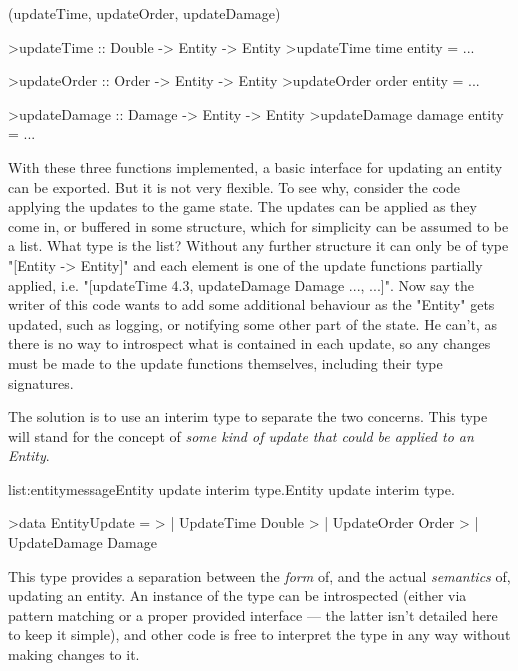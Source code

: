 \functions(updateTime, updateOrder, updateDamage)
\begin{haskell}

>updateTime :: Double -> Entity -> Entity
>updateTime time entity = ...

>updateOrder :: Order -> Entity -> Entity
>updateOrder order entity = ... 

>updateDamage :: Damage -> Entity -> Entity
>updateDamage damage entity = ...

\end{haskell}
\noindent With these three functions implemented, a basic interface for updating an entity can be exported. But it is not very flexible. To see why, consider the code applying the updates to the game state. The updates can be applied as they come in, or buffered in some structure, which for simplicity can be assumed to be a list. What type is the list? Without any further structure it can only be of type "[Entity -> Entity]" and each element is one of the update functions partially applied, i.e. "[updateTime 4.3, updateDamage Damage {...}, ...]". Now say the writer of this code wants to add some additional behaviour as the "Entity" gets updated, such as logging, or notifying some other part of the state. He can't, as there is no way to introspect what is contained in each update, so any changes must be made to the update functions themselves, including their type signatures.

The solution is to use an interim type to separate the two concerns. This type will stand for the concept of \emph{some kind of update that could be applied to an Entity}.

\vspace{-0.5em}
\begin{listing}{list:entitymessage}{Entity update interim type.}{Entity update interim type.}{}
\end{listing}\vspace{-1.5em}

\begin{haskell}

>data EntityUpdate = 
>  | UpdateTime Double
>  | UpdateOrder Order
>  | UpdateDamage Damage

\end{haskell}
\noindent This type provides a separation between the \emph{form} of, and the actual \emph{semantics} of, updating an entity. An instance of the type can be introspected (either via pattern matching or a proper provided interface --- the latter isn't detailed here to keep it simple), and other code is free to interpret the type in any way without making changes to it.

